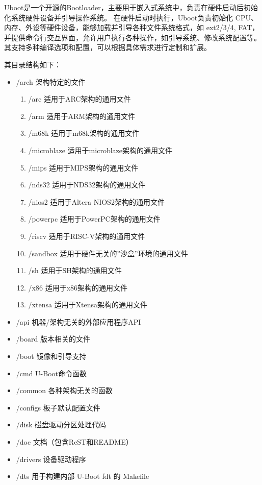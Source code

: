 Uboot是一个开源的Bootloader，主要用于嵌入式系统中，负责在硬件启动后初始化系统硬件设备并引导操作系统。
在硬件启动时执行，Uboot负责初始化 CPU、内存、外设等硬件设备，能够加载并引导各种文件系统格式，如 ext2/3/4, FAT，并提供命令行交互界面，允许用户执行各种操作，如引导系统、修改系统配置等。
其支持多种编译选项和配置，可以根据具体需求进行定制和扩展。

其目录结构如下：

\begin{itemize}
\item
  /arch 架构特定的文件

  \begin{enumerate}
  \def\labelenumi{\arabic{enumi}.}
  \item
    /arc 适用于ARC架构的通用文件
  \item
    /arm 适用于ARM架构的通用文件
  \item
    /m68k 适用于m68k架构的通用文件
  \item
    /microblaze 适用于microblaze架构的通用文件
  \item
    /mips 适用于MIPS架构的通用文件
  \item
    /nds32 适用于NDS32架构的通用文件
  \item
    /nios2 适用于Altera NIOS2架构的通用文件
  \item
    /powerpc 适用于PowerPC架构的通用文件
  \item
    /riscv 适用于RISC-V架构的通用文件
  \item
    /sandbox 适用于硬件无关的''沙盒''环境的通用文件
  \item
    /sh 适用于SH架构的通用文件
  \item
    /x86 适用于x86架构的通用文件
  \item
    /xtensa 适用于Xtensa架构的通用文件
  \end{enumerate}
\item
  /api 机器/架构无关的外部应用程序API
\item
  /board 版本相关的文件
\item
  /boot 镜像和引导支持
\item
  /cmd U-Boot命令函数
\item
  /common 各种架构无关的函数
\item
  /configs 板子默认配置文件
\item
  /disk 磁盘驱动分区处理代码
\item
  /doc 文档（包含ReST和README）
\item
  /drivers 设备驱动程序
\item
  /dts 用于构建内部 U-Boot fdt 的 Makefile

\end{itemize}
